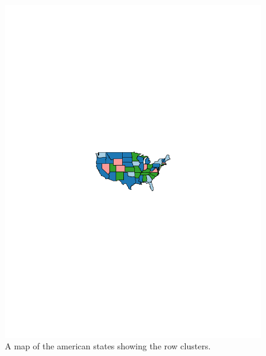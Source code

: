 \documentclass[12pt,a4paper]{article}
\begin{document}
\begin{figure}[H]
	\begin{center}
		\includegraphics[width=\columnwidth]{Multi_map.pdf}
		\caption{A map of the american states showing the row clusters.}
		
	\end{center}
\end{figure}
\end{document}
